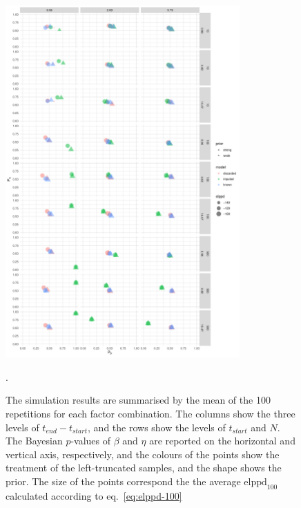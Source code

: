 \begin{figure}
    \centering
    \includegraphics[width=0.8\textwidth]{./figures/ch-2/sim-results-pvalues.pdf}
    \caption{The simulation results are summarised by the mean of the 100 repetitions for each factor combination. The columns show the three levels of $t_{end} - t_{start}$, and the rows show the levels of $t_{start}$ and $N$. The Bayesian $p$-values of $\beta$ and $\eta$ are reported on the horizontal and vertical axis, respectively, and the colours of the points show the treatment of the left-truncated samples, and the shape shows the prior. The size of the points correspond the the average $\text{elppd}_{100}$ calculated according to eq.~\eqref{eq:elppd-100}}.
    \label{fig:sim-study-pvalue}
\end{figure}

